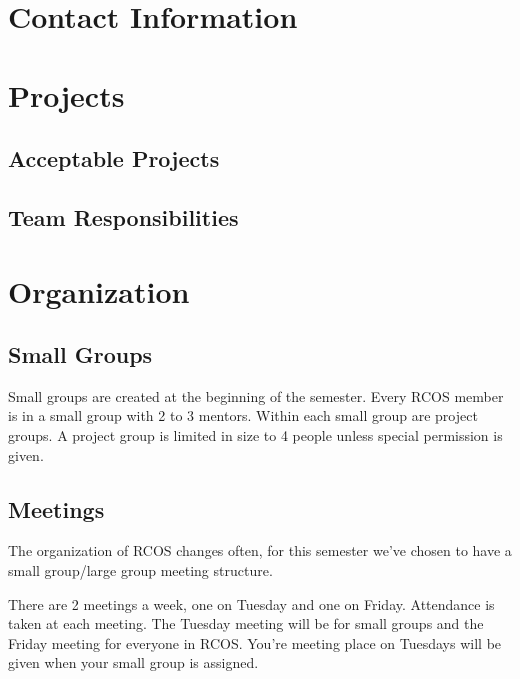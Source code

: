\documentclass[12pt]{article}
\begin{document}
    \section{Contact Information}


    \section{Projects}

    \subsection{Acceptable Projects}


    \subsection{Team Responsibilities}


    \section{Organization}

    \subsection{Small Groups}

    Small groups are created at the beginning of the semester. Every RCOS member is in a small group with 2 to 3 mentors. Within each small group are project groups. A project group is limited in size to 4 people unless special permission is given.

    \subsection{Meetings}

    The organization of RCOS changes often, for this semester we've chosen to have a small group/large group meeting structure.

    There are 2 meetings a week, one on Tuesday and one on Friday. Attendance is taken at each meeting. The Tuesday meeting will be for small groups and the Friday meeting for everyone in RCOS. You're meeting place on Tuesdays will be given when your small group is assigned.
\end{document}
